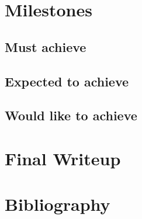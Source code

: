 \documentclass[11pt]{article}
\begin{document}
\section{Milestones}
\subsection{Must achieve}
\subsection{Expected to achieve}
\subsection{Would like to achieve}

\section{Final Writeup}

\section{Bibliography}
\end{document}
